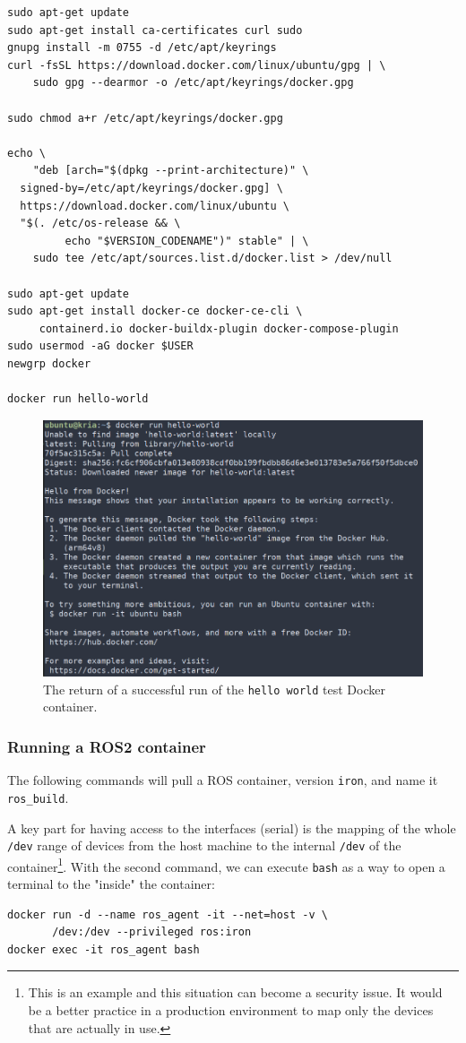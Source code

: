 \documentclass[10pt]{article}
\begin{document}
\begin{verbatim}
sudo apt-get update
sudo apt-get install ca-certificates curl sudo
gnupg install -m 0755 -d /etc/apt/keyrings
curl -fsSL https://download.docker.com/linux/ubuntu/gpg | \
    sudo gpg --dearmor -o /etc/apt/keyrings/docker.gpg

sudo chmod a+r /etc/apt/keyrings/docker.gpg

echo \
    "deb [arch="$(dpkg --print-architecture)" \
  signed-by=/etc/apt/keyrings/docker.gpg] \
  https://download.docker.com/linux/ubuntu \
  "$(. /etc/os-release && \
         echo "$VERSION_CODENAME")" stable" | \
    sudo tee /etc/apt/sources.list.d/docker.list > /dev/null

sudo apt-get update
sudo apt-get install docker-ce docker-ce-cli \
     containerd.io docker-buildx-plugin docker-compose-plugin
sudo usermod -aG docker $USER
newgrp docker

docker run hello-world
\end{verbatim}

\begin{figure}[htbp]
\centering
\includegraphics[width=.7\textwidth]{./img/hello-docker.png}
\caption{\label{fig:org008795f}The return of a successful run of the \texttt{hello world} test Docker container.}
\end{figure}

\subsubsection{Running a ROS2 container}
\label{sec:org0ba1763}
The following commands will pull a ROS container, version \texttt{iron}, and name it \texttt{ros\_build}.

A key part for having access to the interfaces (serial) is the mapping of the whole \texttt{/dev}
range of devices from the host machine to the internal \texttt{/dev} of the container\footnote{This is an example and this situation can become a security issue. It would be a better practice
in a production environment to map only the devices that are actually in use.}.
With the second command, we can execute \texttt{bash} as a way to open a terminal to the "inside" the container:
\begin{verbatim}
docker run -d --name ros_agent -it --net=host -v \
       /dev:/dev --privileged ros:iron
docker exec -it ros_agent bash
\end{verbatim}
\end{document}
